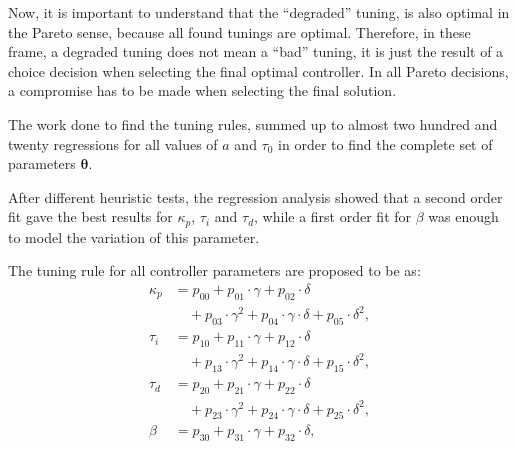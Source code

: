 Now, it is important to understand that the ``degraded'' tuning, is also optimal in the Pareto sense, because all found tunings are optimal. Therefore, in these frame, a degraded tuning does not mean a ``bad'' tuning, it is just the result of a choice decision when selecting the final optimal controller. In all Pareto decisions, a compromise has to be made when selecting the final solution.

The work done to find the tuning rules, summed up to almost two hundred and twenty regressions for all values of $a$ and $\tau_0$ in order to find the complete set of parameters $\bm{\theta}$.

After different heuristic tests, the regression analysis showed that a second order fit gave the best results for $\kappa_p$, $\tau_i$ and $\tau_d$,  while  a first order fit for $\beta$ was enough to model the variation of this parameter. 

The tuning rule for all controller parameters are proposed to be as:  
%
\begin{align}
\kappa_p &= p_{00}+p_{01}\cdot\gamma+p_{02}\cdot\delta\nonumber\\
&\quad + p_{03}\cdot\gamma^2+p_{04}\cdot\gamma\cdot \delta+p_{05}\cdot\delta^2,\label{E:eqkp}\\
%
\tau_i &= p_{10}+p_{11}\cdot\gamma+p_{12}\cdot\delta\nonumber\\
&\quad + p_{13}\cdot\gamma^2+p_{14}\cdot\gamma\cdot \delta+p_{15}\cdot\delta^2,\label{E:eqTi}\\
%
\tau_d &= p_{20}+p_{21}\cdot\gamma+p_{22}\cdot\delta\nonumber\\
&\quad+p_{23}\cdot\gamma^2+p_{24}\cdot\gamma\cdot \delta+p_{25}\cdot\delta^2,\label{E:eqTd}\\
%
\beta &=p_{30}+p_{31}\cdot\gamma+p_{32}\cdot\delta,\label{E:eqbeta}
\end{align}
%

